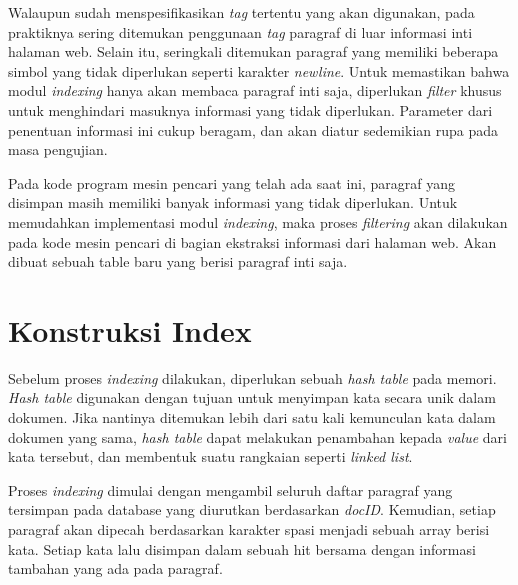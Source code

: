 Walaupun sudah menspesifikasikan \textit{tag} tertentu yang akan digunakan, pada
praktiknya sering ditemukan penggunaan \textit{tag} paragraf di luar informasi
inti halaman web. Selain itu, seringkali ditemukan paragraf yang memiliki
beberapa simbol yang tidak diperlukan seperti karakter \textit{newline}. Untuk
memastikan bahwa modul \textit{indexing} hanya akan membaca paragraf inti saja,
diperlukan \textit{filter} khusus untuk menghindari masuknya informasi yang
tidak diperlukan. Parameter dari penentuan informasi ini cukup beragam, dan akan
diatur sedemikian rupa pada masa pengujian.

Pada kode program mesin pencari yang telah ada saat ini, paragraf yang disimpan
masih memiliki banyak informasi yang tidak diperlukan. Untuk memudahkan
implementasi modul \textit{indexing}, maka proses \textit{filtering} akan
dilakukan pada kode mesin pencari di bagian ekstraksi informasi dari halaman
web. Akan dibuat sebuah table baru yang berisi paragraf inti saja.

\section{Konstruksi Index}

Sebelum proses \textit{indexing} dilakukan, diperlukan sebuah
\textit{hash table} pada memori. \textit{Hash table} digunakan dengan tujuan
untuk menyimpan kata secara unik dalam dokumen. Jika nantinya ditemukan lebih
dari satu kali kemunculan kata dalam dokumen yang sama, \textit{hash table}
dapat melakukan penambahan kepada \textit{value} dari kata tersebut, dan
membentuk suatu rangkaian seperti \textit{linked list}.

Proses \textit{indexing} dimulai dengan mengambil seluruh daftar paragraf yang
tersimpan pada database yang diurutkan berdasarkan \textit{docID}. Kemudian,
setiap paragraf akan dipecah berdasarkan karakter spasi menjadi sebuah array
berisi kata. Setiap kata lalu disimpan dalam sebuah hit bersama dengan informasi
tambahan yang ada pada paragraf.

